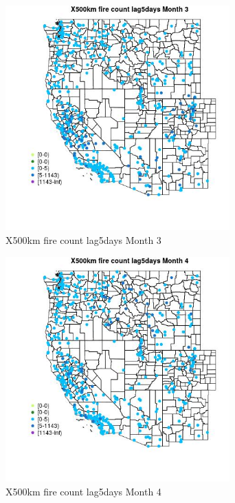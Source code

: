 \begin{figure} 
\centering  
\includegraphics[width=0.77\textwidth]{Code_Outputs/Report_ML_input_PM25_Step4_part_e_de_duplicated_aves_compiled_2019-05-14wNAs_MapObsMo3X500km_fire_count_lag5days.jpg} 
\caption{\label{fig:Report_ML_input_PM25_Step4_part_e_de_duplicated_aves_compiled_2019-05-14wNAsMapObsMo3X500km_fire_count_lag5days}X500km fire count lag5days Month 3} 
\end{figure} 
 

\begin{figure} 
\centering  
\includegraphics[width=0.77\textwidth]{Code_Outputs/Report_ML_input_PM25_Step4_part_e_de_duplicated_aves_compiled_2019-05-14wNAs_MapObsMo4X500km_fire_count_lag5days.jpg} 
\caption{\label{fig:Report_ML_input_PM25_Step4_part_e_de_duplicated_aves_compiled_2019-05-14wNAsMapObsMo4X500km_fire_count_lag5days}X500km fire count lag5days Month 4} 
\end{figure} 
 

